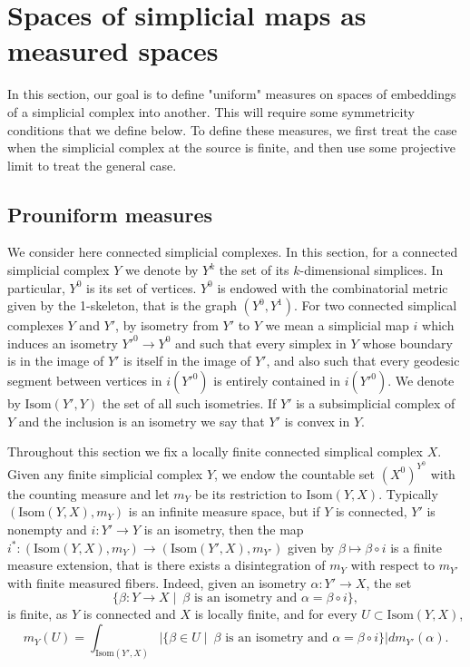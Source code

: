 \documentclass[a4paper, 11pt]{article}
\theoremstyle{plain}
\theoremstyle{definition}
\theoremstyle{remark}
\begin{document}
\section{Spaces of simplicial maps as measured spaces}\label{sec:measure}


In this section, our goal is to define "uniform" measures on spaces of embeddings of a simplicial complex into another. This will require some symmetricity conditions that we define below. To define these measures, we first treat the case when the simplicial complex at the source is finite, and then use some projective limit to treat the general case.

\subsection{Prouniform measures}

We consider here connected simplicial complexes.
In this section, for a connected simplicial complex $Y$ we denote by $Y^k$ the set of its $k$-dimensional simplices.
In particular, $Y^0$ is its set of vertices.
$Y^0$ is endowed with the combinatorial metric given by the 1-skeleton, that is the graph $(Y^0,Y^1)$.
For two connected simplical complexes $Y$ and $Y'$,
by isometry from $Y'$ to $Y$ we mean a simplicial map $i$ which induces an isometry $Y'^0\to Y^0$
and such that every simplex in $Y$ whose boundary is in the image of $Y'$ is itself in the image of $Y'$, and also such that every geodesic segment between vertices in $i(Y'^0)$ is entirely contained in $i(Y'^0)$.
We denote by $\text{Isom}(Y',Y)$ the set of all such isometries.
If $Y'$ is a subsimplicial complex of $Y$ and the inclusion is an isometry we say that $Y'$ is convex in $Y$.

Throughout this section we fix a locally finite connected simplical complex $X$.
Given any finite simplicial complex $Y$, we endow the countable set $(X^0)^{Y^0}$ with the counting measure and let $m_Y$ be its restriction to $\text{Isom}(Y,X)$.
Typically $(\text{Isom}(Y,X),m_Y)$ is an infinite measure space, but if $Y$ is connected, $Y'$ is nonempty and $i:Y'\to Y$ is an isometry,
then the map
$i^*:(\text{Isom}(Y,X),m_Y)\to (\text{Isom}(Y',X),m_{Y'})$ given by $\beta\mapsto \beta\circ i$ is a finite measure extension, that is
there exists a disintegration of $m_Y$ with respect to $m_{Y'}$ with finite measured fibers.
Indeed, given an isometry $\alpha:Y'\to X$, 
the set
\[ \{\beta:Y\to X\mid~\beta \mbox{ is an isometry and } \alpha=\beta\circ i\}, \]
is finite, as $Y$ is connected and $X$ is locally finite,
and for every $U\subset \text{Isom}(Y,X)$,
\[ m_Y(U)=\int_{\text{Isom}(Y',X)} 
|\{\beta\in U\mid~\beta \mbox{ is an isometry and } \alpha=\beta\circ i\}|
dm_{Y'}(\alpha). \]
\end{document}
